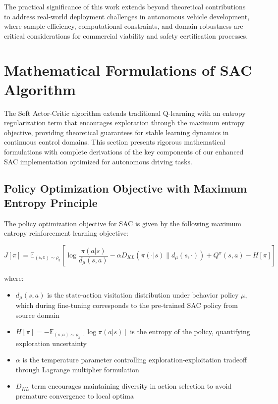 \documentclass[10pt,twocolumn,letterpaper]{article}
\begin{document}
\noindent The practical significance of this work extends beyond theoretical contributions to address real-world deployment challenges in autonomous vehicle development, where sample efficiency, computational constraints, and domain robustness are critical considerations for commercial viability and safety certification processes.

\section{Mathematical Formulations of SAC Algorithm}

The Soft Actor-Critic algorithm extends traditional Q-learning with an entropy regularization term that encourages exploration through the maximum entropy objective, providing theoretical guarantees for stable learning dynamics in continuous control domains. This section presents rigorous mathematical formulations with complete derivations of the key components of our enhanced SAC implementation optimized for autonomous driving tasks.

\subsection{Policy Optimization Objective with Maximum Entropy Principle}

The policy optimization objective for SAC is given by the following maximum entropy reinforcement learning objective:

\begin{equation}
    J[\pi] = \mathbb{E_{(s,a) \sim \rho_\pi}}\left[\log\frac{\pi(a|s)}{d_\mu(s,a)} - \alpha D_{KL}\left(\pi(\cdot|s)\parallel d_\mu(s,\cdot)\right) + Q^\pi(s,a) - H[\pi]\right]
    \label{eq:policy_objective}
\end{equation}

where:
\begin{itemize}
    \item $d_\mu(s,a)$ is the state-action visitation distribution under behavior policy $\mu$, which during fine-tuning corresponds to the pre-trained SAC policy from source domain
    \item $H[\pi] = -\mathbb{E}_{(s,a) \sim \rho_\pi}[\log\pi(a|s)]$ is the entropy of the policy, quantifying exploration uncertainty
    \item $\alpha$ is the temperature parameter controlling exploration-exploitation tradeoff through Lagrange multiplier formulation
    \item $D_{KL}$ term encourages maintaining diversity in action selection to avoid premature convergence to local optima
\end{itemize}
\end{document}
